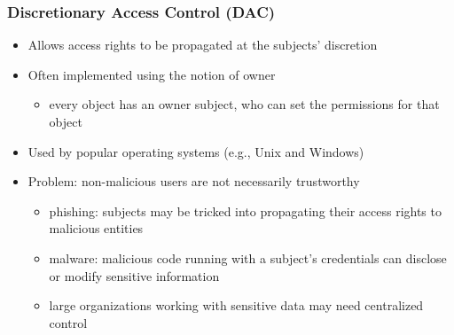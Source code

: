 \documentclass[final]{article}
\begin{document}
\subsubsection*{Discretionary Access Control (DAC)}
\begin{itemize}[nosep]
    \item Allows access rights to be propagated at the subjects’ discretion
    \item Often implemented using the notion of owner
          \begin{itemize}[nosep]
              \item every object has an owner subject, who can set the permissions for that object
          \end{itemize}
    \item Used by popular operating systems (e.g., Unix and Windows)
    \item Problem: non-malicious users are not necessarily trustworthy
          \begin{itemize}[nosep]
              \item phishing: subjects may be tricked into propagating their access rights to malicious entities
              \item malware: malicious code running with a subject’s credentials can disclose or modify sensitive information
              \item large organizations working with sensitive data may need centralized control
          \end{itemize}
\end{itemize}
\end{document}
